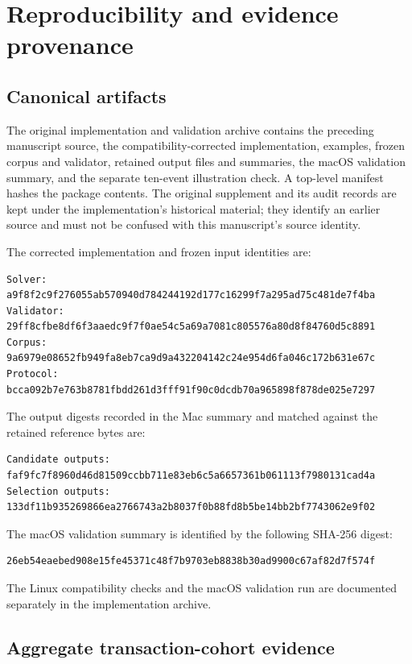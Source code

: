 \section{Reproducibility and evidence provenance}\label{app:reproducibility}

\subsection{Canonical artifacts}

The original implementation and validation archive contains the preceding
manuscript source, the compatibility-corrected implementation, examples, frozen corpus and
validator, retained output files and summaries, the macOS validation summary,
and the separate ten-event illustration check. A top-level manifest hashes
the package contents. The original supplement and its audit records are kept
under the implementation's historical material; they identify an earlier
source and must not be confused with this manuscript's source identity.

The corrected implementation and frozen input identities are:
\begin{lstlisting}
Solver:
a9f8f2c9f276055ab570940d784244192d177c16299f7a295ad75c481de7f4ba
Validator:
29ff8cfbe8df6f3aaedc9f7f0ae54c5a69a7081c805576a80d8f84760d5c8891
Corpus:
9a6979e08652fb949fa8eb7ca9d9a432204142c24e954d6fa046c172b631e67c
Protocol:
bcca092b7e763b8781fbdd261d3fff91f90c0dcdb70a965898f878de025e7297
\end{lstlisting}

The output digests recorded in the Mac summary and matched against the
retained reference bytes are:
\begin{lstlisting}
Candidate outputs:
faf9fc7f8960d46d81509ccbb711e83eb6c5a6657361b061113f7980131cad4a
Selection outputs:
133df11b935269866ea2766743a2b8037f0b88fd8b5be14bb2bf7743062e9f02
\end{lstlisting}

The macOS validation summary is identified by the following SHA-256 digest:
\begin{lstlisting}
26eb54eaebed908e15fe45371c48f7b9703eb8838b30ad9900c67af82d7f574f
\end{lstlisting}
The Linux compatibility checks and the macOS validation run are documented
separately in the implementation archive.

\subsection{Aggregate transaction-cohort evidence}


